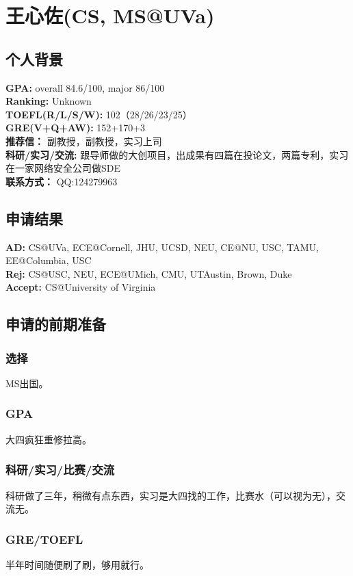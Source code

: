 \documentclass[a4paper,UTF8]{book}
\begin{document}
\clearpage
\section{王心佐(CS, MS@UVa)}
    \subsection*{个人背景}
        \textbf{GPA:} overall 84.6/100, major 86/100\\
        \textbf{Ranking:} Unknown\\
        \textbf{TOEFL(R/L/S/W):} 102（28/26/23/25）\\
        \textbf{GRE(V+Q+AW):} 152+170+3\\
        \textbf{推荐信：} 副教授，副教授，实习上司\\
        \textbf{科研/实习/交流:} 跟导师做的大创项目，出成果有四篇在投论文，两篇专利，实习在一家网络安全公司做SDE\\ 
        \textbf{联系方式：} QQ:124279963

    \subsection*{申请结果}
        \textbf{AD:} CS@UVa, ECE@Cornell, JHU, UCSD, NEU, CE@NU, USC, TAMU, EE@Columbia, USC\\
        \textbf{Rej:} CS@USC, NEU, ECE@UMich, CMU, UTAustin, Brown, Duke\\
        \textbf{Accept:} CS@University of Virginia

    \subsection*{申请的前期准备}
        \subsubsection*{选择}
        MS出国。
        \subsubsection*{GPA}
        大四疯狂重修拉高。
        \subsubsection*{科研/实习/比赛/交流}
        科研做了三年，稍微有点东西，实习是大四找的工作，比赛水（可以视为无），交流无。
        \subsubsection*{GRE/TOEFL}
        半年时间随便刷了刷，够用就行。
\end{document}
